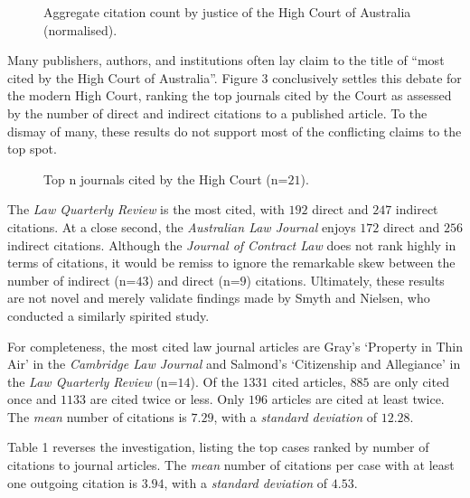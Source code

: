\begin{figure}[!htpb]
    \centering
    
    \caption{Aggregate citation count by justice of the High Court of Australia (normalised).}
\end{figure}

Many publishers, authors, and institutions often lay claim to the title of ``most cited by the High Court of Australia''. Figure 3 conclusively settles this debate for the modern High Court, ranking the top journals cited by the Court as assessed by the number of direct and indirect citations to a published article. To the dismay of many, these results do not support most of the conflicting claims to the top spot.

\begin{figure}[!htpb]
    \centering
    \makebox[\textwidth][c]{}
    \caption{Top n journals cited by the High Court (n=$21$).}
\end{figure}

The \emph{Law Quarterly Review} is the most cited, with $192$ direct and $247$ indirect citations. At a close second, the \emph{Australian Law Journal} enjoys $172$ direct and $256$ indirect citations. Although the \emph{Journal of Contract Law} does not rank highly in terms of citations, it would be remiss to ignore the remarkable skew between the number of indirect (n=$43$) and direct (n=$9$) citations. Ultimately, these results are not novel and merely validate findings made by Smyth and Nielsen, who conducted a similarly spirited study.

For completeness, the most cited law journal articles are Gray's `Property in Thin Air' in the \textit{Cambridge Law Journal} and Salmond's `Citizenship and Allegiance' in the \textit{Law Quarterly Review} (n=$14$). Of the $1331$ cited articles, $885$ are only cited once and $1133$ are cited twice or less. Only $196$ articles are cited at least twice. The \emph{mean} number of citations is $7.29$, with a \emph{standard deviation} of $12.28$.

Table 1 reverses the investigation, listing the top cases ranked by number of citations to journal articles. The \emph{mean} number of citations per case with at least one outgoing citation is $3.94$, with a \emph{standard deviation} of $4.53$. 

